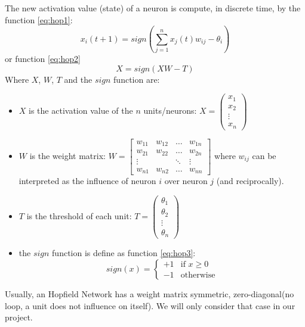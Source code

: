 The new activation value (state) of a neuron is compute, in discrete time, by the function \ref{eq:hop1}:
\begin{equation}
\label{eq:hop1}
x_i(t + 1) = sign(\sum_{j = 1}^{n}x_j(t)w_{ij} - \theta_i)
\end{equation}
or function \ref{eq:hop2}\\
\begin{equation}
\label{eq:hop2}
X = sign(XW - T)
\end{equation}
Where $X$, $W$, $T$ and the $sign$ function are:
\begin{itemize}
  \item $X$ is the activation value of the $n$ units/neurons: $X = \left(\begin{array}{c}
x_1\\ 
x_2\\
\vdots \\
x_n
\end{array}\right)$
  \item $W$ is the weight matrix: $W = \begin{bmatrix}
w_{11} & w_{12} & \dots & w_{1n}  \\
w_{21} & w_{22} & \dots & w_{2n} \\
\vdots  &            & \ddots & \vdots \\
w_{n1} & w_{n2} & \dots & w_{nn} 
\end{bmatrix}$ where $w_{ij}$ can be interpreted as the influence of neuron $i$ over neuron $j$ (and reciprocally).
  \item $T$ is the threshold of each unit: $T = \left(\begin{array}{c}
\theta_{1}\\ 
\theta_2\\
\vdots \\
\theta_{n}
\end{array}\right)$
  \item the $sign$ function is define as function \ref{eq:hop3}:
  \begin{equation}
	\label{eq:hop3}
	sign(x) = \begin{cases}
					+1 & \text{if } x \geq 0\\
					-1 & \text{otherwise}
				\end{cases}
  \end{equation}
\end{itemize}

Usually, an Hopfield Network has a weight matrix symmetric, zero-diagonal(no loop, a unit does not influence on itself). We will only consider that case in our project. 

